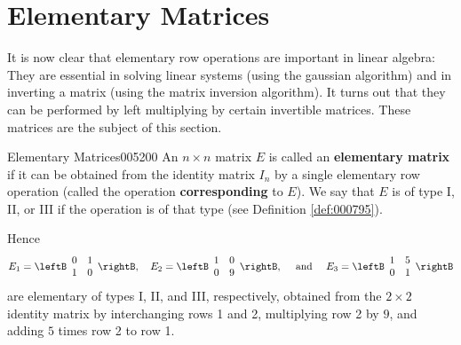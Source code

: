 \section{Elementary Matrices}
\label{sec:2_5}

It is now clear that elementary row operations are important in linear algebra: They are essential in solving linear systems (using the gaussian algorithm) and in inverting a matrix (using the matrix inversion algorithm). It turns out that they can be performed by left multiplying by certain invertible matrices. These matrices are the subject of this section.

\begin{definition}{Elementary Matrices}{005200}
An $n \times n$ matrix $E$ is called an \textbf{elementary matrix} if it can be obtained from the identity matrix $I_{n}$ by a single elementary row operation (called the operation \textbf{corresponding} to $E$). We say that $E$ is of type I, II, or III if the operation is of that type (see Definition \ref{def:000795}).
\end{definition}

Hence
\begin{equation*}
E_{1} = \leftB \begin{array}{rr}
0 & 1 \\
1 & 0
\end{array} \rightB, \quad E_{2} = \leftB \begin{array}{rr}
1 & 0 \\
0 & 9
\end{array} \rightB, \quad \mbox{ and } \quad E_{3} = \leftB \begin{array}{rr}
1 & 5 \\
0 & 1
\end{array} \rightB
\end{equation*}
are elementary of types I, II, and III, respectively, obtained from the $2 \times 2$ identity matrix by interchanging rows 1 and 2, multiplying row 2 by
 $9$, and adding $5$ times row 2 to row 1.

